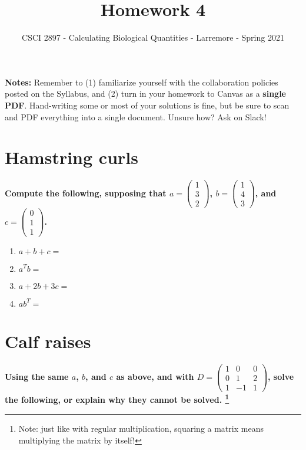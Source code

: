 \documentclass[11pt,onecolumn,superscriptaddress,notitlepage]{article}
\date{}
\begin{document}
\author{CSCI 2897 - Calculating Biological Quantities - Larremore - Spring 2021}
\title{Homework 4}
\maketitle

{\bf Notes:} Remember to (1) familiarize yourself with the collaboration policies posted on the Syllabus, and (2) turn in your homework to Canvas as a {\bf single PDF}. Hand-writing some or most of your solutions is fine, but be sure to scan and PDF everything into a single document. Unsure how? Ask on Slack! 

\section*{Hamstring curls}

{\bf Compute the following, supposing that 
$a=
\begin{pmatrix}
1 \\ 
3 \\
2
\end{pmatrix}$,
$b=
\begin{pmatrix}
1 \\ 
4 \\
3
\end{pmatrix}$, and  
$c=
\begin{pmatrix}
0 \\ 
1 \\
1
\end{pmatrix}$. 
} 

\begin{enumerate}
	\item $a+b+c = $
	\item $a^{T}b = $
	\item $a+2b+3c = $
	\item $a b^{T} = $
\end{enumerate}

\section*{Calf raises} 

{\bf Using the same $a$, $b$, and $c$ as above, and with 
$D=
\begin{pmatrix}
1 & 0 &0  \\ 
0 & 1 & 2\\
1 & -1& 1
\end{pmatrix}$, solve the following, or explain why they cannot be solved. \footnote{Note: just like with regular multiplication, squaring a matrix means multiplying the matrix by itself!}}
\end{document}
